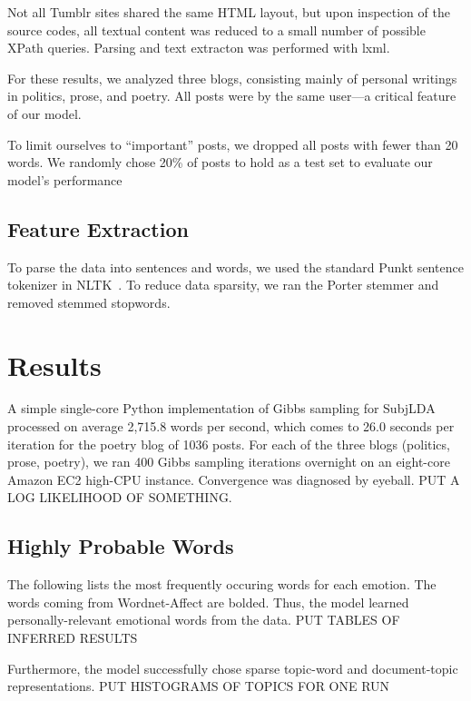 \documentclass{article}
\newcommand{\fix}{\marginpar{FIX}}
\begin{document}
Not all Tumblr sites shared the same HTML layout, but upon inspection
of the source codes, all textual content was reduced to a small
number of possible XPath queries. Parsing and text extracton was
performed with lxml.

For these results, we analyzed three blogs, consisting mainly of
personal writings in politics, prose, and poetry. All posts were
by the same user---a critical feature of our model.

To limit ourselves to ``important'' posts, we dropped all posts
with fewer than 20 words. We randomly chose 20\% of posts to hold
as a test set to evaluate our model's performance

\subsection{Feature Extraction}
To parse the data into sentences and words, we used the standard
Punkt sentence tokenizer in NLTK~\citep{bird09}. To reduce data
sparsity, we ran the Porter stemmer and removed stemmed stopwords.
\fix{TODO: ADD COUNTING STATISTICS.}

\section{Results} 
A simple single-core Python implementation of Gibbs sampling for
SubjLDA processed on average 2,715.8 words per second, which comes
to 26.0 seconds per iteration for the poetry blog of 1036 posts.
For each of the three blogs (politics, prose, poetry), we ran 400
Gibbs sampling iterations overnight on an eight-core Amazon EC2
high-CPU instance. Convergence was diagnosed by eyeball.
PUT A LOG LIKELIHOOD OF SOMETHING.

\subsection{Highly Probable Words}
The following lists the most frequently occuring words for each
emotion. The words coming from Wordnet-Affect are bolded. Thus,
the model learned personally-relevant emotional words from the data.
PUT TABLES OF INFERRED RESULTS

Furthermore, the model successfully chose sparse topic-word
and document-topic representations.
PUT HISTOGRAMS OF TOPICS FOR ONE RUN
\end{document}
